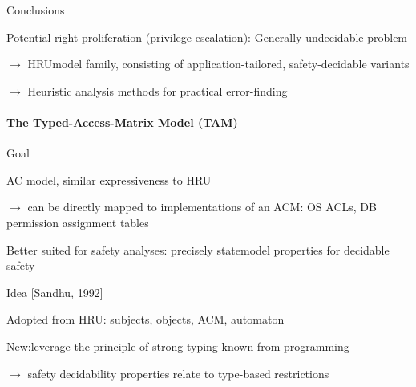 \documentclass[a4paper]{article}
\begin{document}
\begin{multicols}{3}
    Conclusions
    \begin{itemize*}
        \item Potential right proliferation (privilege escalation): Generally undecidable problem
        \item $\rightarrow$  HRUmodel family, consisting of application-tailored, safety-decidable variants
        \item $\rightarrow$  Heuristic analysis methods for practical error-finding
    \end{itemize*}

    \paragraph{The Typed-Access-Matrix Model (TAM)}
    Goal
    \begin{itemize*}
        \item AC model, similar expressiveness to HRU
        \item $\rightarrow$  can be directly mapped to implementations of an ACM: OS ACLs, DB permission assignment tables
        \item Better suited for safety analyses: precisely statemodel properties for decidable safety
    \end{itemize*}

    Idea [Sandhu, 1992]
    \begin{itemize*}
        \item Adopted from HRU: subjects, objects, ACM, automaton
        \item New:leverage the principle of strong typing known from programming
        \item $\rightarrow$  safety decidability properties relate to type-based restrictions
    \end{itemize*}


\end{multicols}
\end{document}
